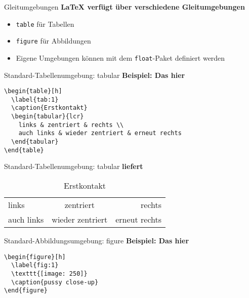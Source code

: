 \documentclass[11pt]{beamer}
\begin{document}
\begin{frame}{Gleitumgebungen}
\textbf{{\LaTeX} verfügt über verschiedene Gleitumgebungen}
\begin{itemize}
\item \texttt{table} für Tabellen
\item \texttt{figure} für Abbildungen
\item Eigene Umgebungen können mit dem \texttt{float}-Paket definiert werden 
\end{itemize}
\end{frame}

{

}

{

}

\begin{frame}[fragile]{Standard-Tabellenumgebung: tabular}
\textbf{Beispiel: Das hier}
\begin{verbatim}
\begin{table}[h]
  \label{tab:1}
  \caption{Erstkontakt}
  \begin{tabular}{lcr}
    links & zentriert & rechts \\
    auch links & wieder zentriert & erneut rechts
  \end{tabular}
\end{table}
\end{verbatim}
\end{frame}

\begin{frame}[fragile]{Standard-Tabellenumgebung: tabular}
\textbf{liefert}
\begin{table}[h]
  \label{tab:1}
  \caption{Erstkontakt}
  \begin{tabular}{lcr}
    links & zentriert & rechts \\
    auch links & wieder zentriert & erneut rechts
  \end{tabular}
\end{table}
\end{frame}

{

}

\begin{frame}[fragile]{Standard-Abbildungsumgebung: figure}
\textbf{Beispiel: Das hier}
\begin{verbatim}
\begin{figure}[h]
  \label{fig:1}
  \texttt{[image: 250]}
  \caption{pussy close-up}
\end{figure}
\end{verbatim}
\end{frame}
\end{document}
